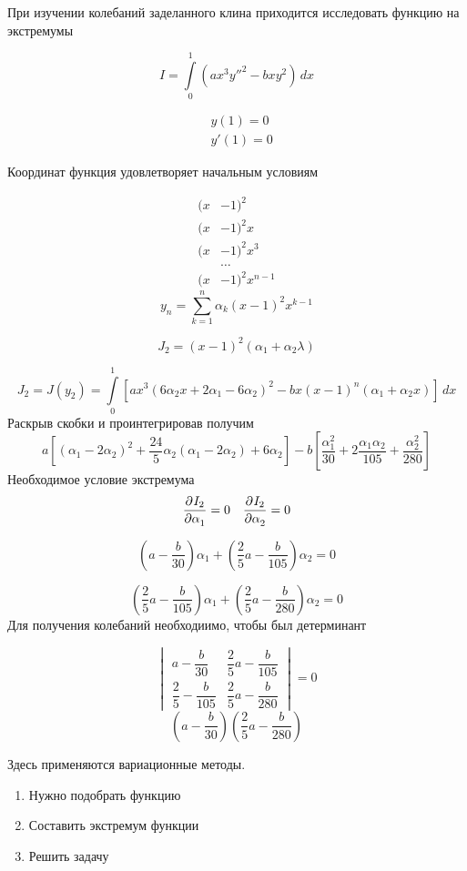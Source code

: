 При изучении колебаний заделанного клина приходится исследовать функцию на экстремумы
\begin{example}{}
\[
I = \int\limits_0^1 (ax^3 y''^2- b x y^2)\, dx
\]

\begin{align*}
&y(1) = 0\\
&y'(1) = 0
\end{align*}

Координат функция удовлетворяет начальным условиям

\begin{align*}
(x &- 1)^2\\
(x &- 1)^2x\\
(x &- 1)^2x^3\\
&\ldots\\
(x &- 1)^2 x^{n-1}
\end{align*}
\[
y_n = \sum\limits_{k = 1}^n \alpha_k (x - 1)^2 x^{k - 1}
\]

\[
J_2 = (x - 1)^2(\alpha_1 + \alpha_2 \lambda)
\]

\[
J_2 = J(y_2) = \int\limits_0^1 \left[ ax^3 (6 \alpha_2x + 2 \alpha_1 - 6 \alpha_2)^2 -bx (x - 1)^n(\alpha_1 + \alpha_2 x) \right] \, dx
\]
Раскрыв скобки и проинтегрировав получим
\[
a \left[(\alpha_1-2\alpha_2)^2+\frac{24}{5}\alpha_2(\alpha_1 - 2 \alpha_2) + 6 \alpha_2 \right] - b\left[\frac{\alpha_1^2}{30} +2 \frac{\alpha_1\alpha_2}{105}+\frac{\alpha_2^2}{280} \right]
\]
Необходимое условие экстремума
\[
\frac{\partial^{}I_2}{\partial \alpha_1^{}} = 0 \quad \frac{\partial^{}I_2}{\partial \alpha_2^{}} = 0
\]

\[
\left(a - \frac{b}{30}\right)\alpha_1 + \left(\frac{2}{5} a - \frac{b}{105}\right) \alpha_2 = 0
\]

\[
\left(\frac{2}{5} a - \frac{b}{105}\right)\alpha_1 + \left(\frac{2}{5}a - \frac{b}{280}\right) \alpha_2 = 0
\]
Для получения колебаний необходиимо, чтобы был детерминант

\[
\begin{vmatrix} 
a - \dfrac{b}{30}& \dfrac{2}{5} a - \dfrac{b}{105}\\
\dfrac{2}{5} - \dfrac{b}{105}& \dfrac{2}{5}a - \dfrac{b}{280}
\end{vmatrix} = 0
\]
\[
\left(a - \frac{b}{30}\right) \left(\frac{2}{5}a - \frac{b}{280}\right)
\]
\end{example}
Здесь применяются вариационные методы.

\begin{enumerate}
\item Нужно подобрать функцию
\item Составить экстремум функции
\item Решить задачу
\end{enumerate}

